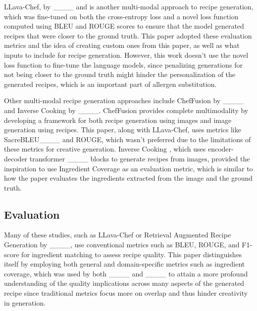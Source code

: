 LLava-Chef, by ____ and  is another multi-modal approach to recipe generation, which was fine-tuned on both the cross-entropy loss and a novel loss function computed using BLEU and ROUGE scores to ensure that the model generated recipes that were closer to the ground truth. This paper adopted these evaluation metrics and the idea of creating custom ones from this paper, as well as what inputs to include for recipe generation. However, this work doesn't use the novel loss function to fine-tune the language models, since penalizing generations for not being closer to the ground truth might hinder the personalization of the generated recipes, which is an important part of allergen substitution.

Other multi-modal recipe generation approaches include ChefFusion by ____ and Inverse Cooking by ____. ChefFusion provides complete multimodality by developing a framework for both recipe generation using images and image generation using recipes. This paper, along with LLava-Chef, uses metrics like SacreBLEU____ and ROUGE, which wasn't preferred due to the limitations of these metrics for creative generation. Inverse Cooking ,  which uses encoder-decoder transformer ____ blocks to generate recipes from images, provided the inspiration to use Ingredient Coverage as an evaluation metric, which is similar to how the paper evaluates the ingredients extracted from the image and the ground truth.
\vspace{-5pt}
\subsection{Evaluation}
Many of these studies, such as LLava-Chef or Retrieval Augmented Recipe Generation by ____, use conventional metrics such as BLEU, ROUGE, and F1-score for ingredient matching to assess recipe quality. This paper distinguishes itself by employing both general and domain-specific metrics such as ingredient coverage, which was used by both ____ and ____ to attain a more profound understanding of the quality implications across many aspects of the generated recipe since traditional metrics focus more on overlap and thus hinder creativity in generation.